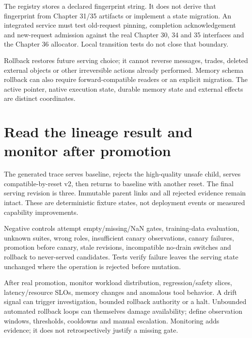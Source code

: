 The registry stores a declared fingerprint string. It does not derive that
fingerprint from Chapter 31/35 artifacts or implement a state migration.
An integrated service must test old-request pinning, completion acknowledgement
and new-request admission against the real Chapter 30, 34 and 35 interfaces and the
Chapter 36 allocator. Local transition tests do not close that boundary.

Rollback restores future serving choice; it cannot reverse messages, trades,
deleted external objects or other irreversible actions already performed.
Memory schema rollback can also require forward-compatible readers or an
explicit migration. The active pointer, native execution state, durable
memory state and external effects are distinct coordinates.

\section{Read the lineage result and monitor after promotion}
\label{evod43:evidence}
\begin{center}\end{center}
The generated trace serves baseline, rejects the high-quality unsafe child,
serves compatible-by-reset v2, then returns to baseline with another reset.
The final serving revision is three. Immutable parent links and all rejected
evidence remain intact. These are deterministic fixture states, not deployment
events or measured capability improvements.

Negative controls attempt empty/missing/NaN gates, training-data evaluation,
unknown suites, wrong roles, insufficient canary observations, canary failures,
promotion before canary, stale revisions, incompatible no-drain switches and
rollback to never-served candidates. Tests verify failure leaves the serving
state unchanged where the operation is rejected before mutation.

After real promotion, monitor workload distribution, regression/safety slices,
latency/resource SLOs, memory changes and anomalous tool behavior. A drift
signal can trigger investigation, bounded rollback authority or a halt.
Unbounded automated rollback loops can themselves damage availability;
define observation windows, thresholds, cooldowns and manual escalation.
Monitoring adds evidence; it does not retrospectively justify a missing gate.

